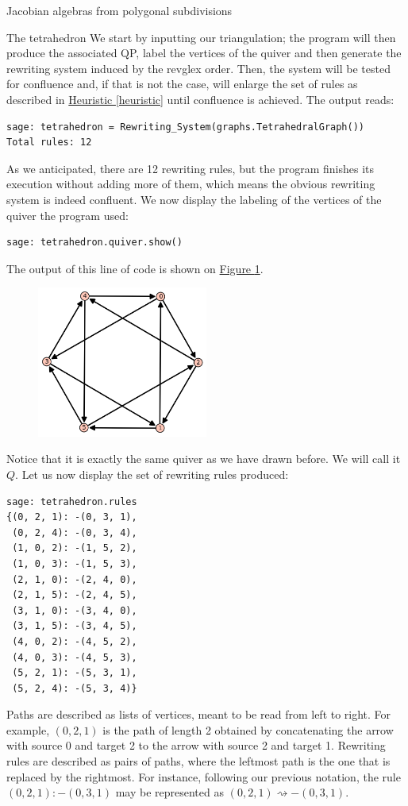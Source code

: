 \begin{chapter}{Jacobian algebras from polygonal subdivisions}
\begin{section}{The tetrahedron}
We start by inputting our triangulation; the program will then produce the associated QP, label the vertices of the quiver and then generate the rewriting system induced by the revglex order. Then, the system will be tested for confluence and, if that is not the case, will enlarge the set of rules as described in \hyperref[heuristic]{Heuristic \ref*{heuristic}} until confluence is achieved. The output reads:
\begin{lstlisting}
sage: tetrahedron = Rewriting_System(graphs.TetrahedralGraph())
Total rules: 12
\end{lstlisting}
As we anticipated, there are 12 rewriting rules, but the program finishes its execution without adding more of them, which means the obvious rewriting system is indeed confluent. We now display the labeling of the vertices of the quiver the program used:
\begin{lstlisting}
sage: tetrahedron.quiver.show()
\end{lstlisting}
The output of this line of code is shown on \hyperref[quiverfigure]{Figure \ref*{quiverfigure}}.
\begin{figure}[h] 
\centering
\includegraphics[width=0.5\textwidth]{tetra_quiver.png}
\caption{}
\label{quiverfigure}
\end{figure}
Notice that it is exactly the same quiver as we have drawn before. We will call it $Q$. Let us now display the set of rewriting rules produced:
\begin{lstlisting}
sage: tetrahedron.rules
{(0, 2, 1): -(0, 3, 1),
 (0, 2, 4): -(0, 3, 4),
 (1, 0, 2): -(1, 5, 2),
 (1, 0, 3): -(1, 5, 3),
 (2, 1, 0): -(2, 4, 0),
 (2, 1, 5): -(2, 4, 5),
 (3, 1, 0): -(3, 4, 0),
 (3, 1, 5): -(3, 4, 5),
 (4, 0, 2): -(4, 5, 2),
 (4, 0, 3): -(4, 5, 3),
 (5, 2, 1): -(5, 3, 1),
 (5, 2, 4): -(5, 3, 4)}
\end{lstlisting}
Paths are described as lists of vertices, meant to be read from left to right. For example, $(0,2,1)$ is the path of length 2 obtained by concatenating the arrow with source 0 and target 2 to the arrow with source 2 and target 1. Rewriting rules are described as pairs of paths, where the leftmost path is the one that is replaced by the rightmost. For instance, following our previous notation, the rule $(0, 2, 1): -(0, 3, 1)$ may be represented as $(0,2,1) \rightsquigarrow -(0,3,1)$.


\end{section}
\end{chapter}
